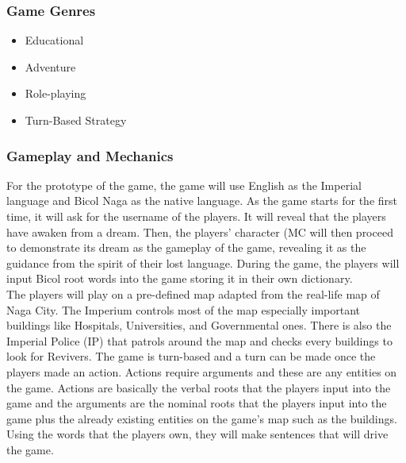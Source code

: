 \documentclass[11pt]{article}
\begin{document}
\subsubsection{Game Genres}
\begin{itemize}
\item
  Educational
\item
  Adventure
\item
  Role-playing
\item
  Turn-Based Strategy
\end{itemize}
  
\subsubsection{Gameplay and Mechanics}
For the prototype of the game, the game will use English as the Imperial language and Bicol Naga as the native language. As the game starts for the first time, it will ask for the username of the players. It will reveal that the players have awaken from a dream. Then, the players' character (MC will then proceed to demonstrate its dream as the gameplay of the game, revealing it as the guidance from the spirit of their lost language. During the game, the players will input Bicol root words into the game storing it in their own dictionary.\\
The players will play on a pre-defined map adapted from the real-life map of Naga City. The Imperium controls most of the map especially important buildings like Hospitals, Universities, and Governmental ones. There is also the Imperial Police (IP) that patrols around the map and checks every buildings to look for Revivers. The game is turn-based and a turn can be made once the players made an action. Actions require arguments and these are any entities on the game. Actions are basically the verbal roots that the players input into the game and the arguments are the nominal roots that the players input into the game plus the already existing entities on the game's map such as the buildings. Using the words that the players own, they will make sentences that will drive the game.\\
\end{document}
